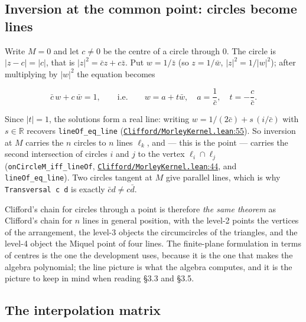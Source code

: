 \documentclass[11pt]{article}
\theoremstyle{definition}
\theoremstyle{remark}
\begin{document}
\hypertarget{inversion-at-the-common-point-circles-become-lines}{%
\subsection{Inversion at the common point: circles become lines}\label{inversion-at-the-common-point-circles-become-lines}}

Write \(M = 0\) and let \(c \ne 0\) be the centre of a circle through \(0\). The circle is \(|z - c| = |c|\),
that is \(|z|^2 = \bar c z + c \bar z\). Put \(w = 1/\bar z\) (so \(z = 1/\bar w\), \(|z|^2 = 1/|w|^2\)); after
multiplying by \(|w|^2\) the equation becomes

\[ \bar c \, w + c \, \bar w = 1 , \qquad \text{i.e.} \qquad w = a + t \bar w, \quad a = \frac{1}{\bar c}, \quad t = -\frac{c}{\bar c}. \]

Since \(|t| = 1\), the solutions form a real line: writing \(w = 1/(2\bar c) + s\,(i/\bar c)\)
with \(s \in \mathbb{R}\) recovers \texttt{lineOf\_\allowbreak eq\_\allowbreak line} (\href{https://github.com/jpbald93/paperl_clifford_chain/blob/e1ae145c2565cc98816635387412edc0a740c27c/Clifford/MorleyKernel.lean\#L55}{\texttt{Clifford/\allowbreak MorleyKernel.lean}:55}). So inversion at \(M\)
carries the \(n\) circles to \(n\) lines \(\ell_k\), and --- this is the point --- carries the second intersection of
circles \(i\) and \(j\) to the vertex \(\ell_i \cap \ell_j\) (\texttt{onCircleM\_\allowbreak iff\_\allowbreak lineOf},
\href{https://github.com/jpbald93/paperl_clifford_chain/blob/e1ae145c2565cc98816635387412edc0a740c27c/Clifford/MorleyKernel.lean\#L44}{\texttt{Clifford/\allowbreak MorleyKernel.lean}:44}, and \texttt{lineOf\_\allowbreak eq\_\allowbreak line}). Two circles tangent at \(M\) give parallel lines,
which is why \texttt{Transversal\ c\ d} is exactly \(\bar c d \ne c \bar d\).

Clifford's chain for circles through a point is therefore \emph{the same theorem} as Clifford's chain for \(n\)
lines in general position, with the level-2 points the vertices of the arrangement, the level-3 objects the
circumcircles of the triangles, and the level-4 object the Miquel point of four lines. The finite-plane
formulation in terms of centres is the one the development uses, because it is the one that makes the
algebra polynomial; the line picture is what the algebra computes, and it is the picture to keep in mind
when reading \S{}3.3 and \S{}3.5.

\hypertarget{the-interpolation-matrix}{%
\subsection{The interpolation matrix}\label{the-interpolation-matrix}}
\end{document}
